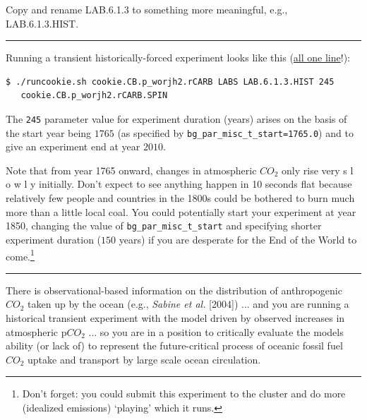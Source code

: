 Copy and rename \textsf{\footnotesize LAB.6.1.3} to something more meaningful, e.g., \textsf{\footnotesize LAB.6.1.3.HIST}.

\vspace{1mm}\noindent\rule{4cm}{0.1mm}\vspace{2mm}

\noindent Running a transient historically-forced experiment looks like this (\uline{all one line}!):
\vspace{-2pt}\small\begin{verbatim}
$ ./runcookie.sh cookie.CB.p_worjh2.rCARB LABS LAB.6.1.3.HIST 245
   cookie.CB.p_worjh2.rCARB.SPIN
\end{verbatim}\normalsize\vspace{-2pt}
The \texttt{245} parameter value for experiment duration (years) arises on the basis of the start year being \(1765\) (as specified by \texttt{\small bg\_par\_misc\_t\_start=1765.0}) and to give an experiment end at year \(2010\).

\vspace{1mm}
Note that from year 1765 onward, changes in atmospheric \(CO_{2}\) only rise very s l o w l y initially. Don't expect to see anything happen in 10 seconds flat because relatively few people and countries in the 1800s could be bothered to burn much more than a little local coal. You could potentially start your experiment at year 1850, changing the value of \texttt{\small bg\_par\_misc\_t\_start} and specifying shorter experiment duration (\(150\) years) if you are desperate for the End of the World to come.\footnote{Don’t forget: you could submit this experiment to the cluster and do more (idealized emissions) ‘playing’ which it runs.} 

\vspace{1mm}\noindent\rule{4cm}{0.1mm}\vspace{2mm}

\noindent There is observational-based information on the distribution of anthropogenic \(CO_{2}\) taken up by the ocean (e.g., \textit{Sabine et al.} [2004]) ... and you are running a historical transient experiment with the model driven by observed increases in atmospheric p\(CO_{2}\) ... so you are in a position to critically evaluate the models ability (or lack of) to represent the future-critical process of oceanic fossil fuel \(CO_{2}\) uptake and transport by large scale ocean circulation.

